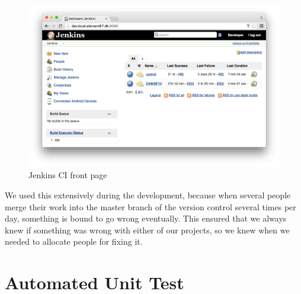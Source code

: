 \begin{figure}[!htbp]
    \centering
    \includegraphics[width=\textwidth]{graphic/quality_assurance/jenkins_frontpage}
    \caption{Jenkins CI front page}
    \label{fig:jenkins_front_page}
\end{figure}
\FloatBarrier

We used this extensively during the development, because when several people merge their work into the master branch of the version control several times per day, something is bound to go wrong eventually. This ensured that we always knew if something was wrong with either of our projects, so we knew when we needed to allocate people for fixing it. 


\section{Automated Unit Test}
\label{sec:automated_unit_test}

